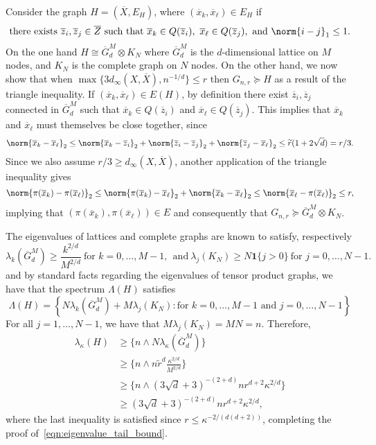 \documentclass{article}
\newcommand{\set}[1]{\left\{#1\right\}}
\newcommand{\1}{\mathbf{1}}
\newcommand{\wt}[1]{\widetilde{#1}}
\newcommand{\ol}[1]{\overline{#1}}
\theoremstyle{alden}
\theoremstyle{aldenthm}
\theoremstyle{definition}
\theoremstyle{remark}
\begin{document}
Consider the graph $H = (\overline{X}, E_H)$, where $(\ol{x}_k, \ol{x}_{\ell}) \in E_H$ if
\begin{equation*}
\textrm{there exists}~\ol{z}_i, \ol{z}_j \in \ol{Z}~\textrm{such that}~\ol{x}_k \in Q(\ol{z}_i),~ \ol{x}_\ell \in Q(\ol{z}_j),~\textrm{and}~\norm{i - j}_1 \leq 1.
\end{equation*}
On the one hand $H \cong \ol{G}^M_d \otimes K_N$ where $\ol{G}^M_d$ is the $d$-dimensional lattice on $M$ nodes, and $K_N$ is the complete graph on $N$ nodes. On the other hand, we now show that when $\max\{3d_{\infty}(X,\ol{X}), n^{-1/d}\} \leq r$ then $G_{n,r} \succeq H$ as a result of the triangle inequality. If $(\ol{x}_k, \ol{x}_{\ell}) \in E(H)$, by definition there exist $\ol{z}_i, \ol{z}_j$ connected in $\ol{G}_d^M$ such that $\ol{x}_k \in Q(\ol{z}_i)$ and $\ol{x}_{\ell} \in Q(\ol{z}_j)$. This implies that $\ol{x}_k$ and $\ol{x}_{\ell}$ must themselves be close together, since
\begin{equation*}
\norm{\ol{x}_k - \ol{x}_{\ell}}_2 \leq \norm{\ol{x}_k - \ol{z}_{i}}_2 + \norm{\ol{z}_i - \ol{z}_j}_2 +  \norm{\ol{z}_{j} - \ol{x}_{\ell} }_2 \leq \wt{r}(1 + 2\sqrt{d}) = r/3.
\end{equation*}
Since we also assume $r/3 \geq d_{\infty}(X,\ol{X})$, another application of the triangle inequality gives
\begin{equation*}
\norm{\pi(\ol{x}_k) - \pi(\ol{x}_\ell)}_2 \leq \norm{\pi(\ol{x}_k) - \ol{x}_\ell}_2 + \norm{\ol{x}_k - \ol{x}_\ell}_2 \leq \norm{\ol{x}_{\ell} - \pi(\ol{x}_\ell)}_2 \leq r,
\end{equation*}
implying that $(\pi(\ol{x}_k), \pi(\ol{x}_{\ell})) \in E$ and consequently that $G_{n,r} \succeq \ol{G}^M_d \otimes K_N$.

The eigenvalues of lattices and complete graphs are known to satisfy, respectively
\begin{equation*}
\lambda_k(\ol{G}^{M}_d) \geq \frac{k^{2/d}}{M^{2/d}}~\textrm{for $k = 0,\ldots,M - 1$},~~ \textrm{and}~\lambda_{j}(K_N) \geq N\1\{j > 0\}~\textrm{for $j = 0,\ldots,N-1$.}
\end{equation*}
and by standard facts regarding the eigenvalues of tensor product graphs, we have that the spectrum $\Lambda(H)$ satisfies
\begin{equation*}
\Lambda(H) = \set{N\lambda_k(\ol{G}^{M}_d) + M\lambda_j(K_N): \textrm{for $k = 0,\ldots,M - 1$ and $j = 0,\ldots,N-1$}}
\end{equation*}
For all $j = 1,\ldots,N-1$, we have that $M\lambda_j(K_N) = MN = n$. Therefore,
\begin{align*}
\lambda_{\kappa}(H) & \geq \{n \wedge N\lambda_{\kappa}(\ol{G}^{M}_d)\} \\
& \geq \{n \wedge n\wt{r}^d\frac{\kappa^{2/d}}{M^{2/d}}\} \\
& \geq \{n \wedge (3\sqrt{d} + 3)^{-(2+d)}nr^{d+2}\kappa^{2/d}\} \\
& \geq (3\sqrt{d} + 3)^{-(2+d)}nr^{d+2}\kappa^{2/d},
\end{align*}
where the last inequality is satisfied since $r \leq \kappa^{-2/(d(d + 2))}$, completing the proof of~\eqref{eqn:eigenvalue_tail_bound}.
\end{document}
